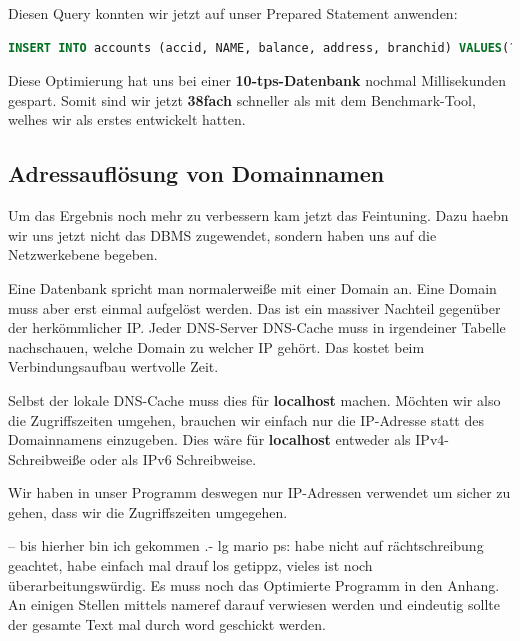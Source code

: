 Diesen Query konnten wir jetzt auf unser Prepared Statement anwenden:
\begin{lstlisting}[language=sql]
INSERT INTO accounts (accid, NAME, balance, address, branchid) VALUES(?, 'account', 0,'test', trunc(random() * n + 1))
\end{lstlisting}

Diese Optimierung  hat uns bei einer \textbf{10-tps-Datenbank} nochmal  Millisekunden gespart. Somit sind wir jetzt \textbf{38fach} schneller 
als mit dem Benchmark-Tool, welhes wir als erstes entwickelt hatten.



\subsection{Adressauflösung von Domainnamen}
Um das Ergebnis noch mehr zu verbessern kam jetzt das Feintuning. Dazu
haebn wir uns jetzt nicht das DBMS zugewendet, sondern haben uns auf die Netzwerkebene begeben.

Eine Datenbank spricht man normalerweiße mit einer Domain an. 
Eine Domain muss aber erst einmal aufgelöst werden.
Das ist ein massiver Nachteil gegenüber der herkömmlicher IP. Jeder
DNS-Server \bzw DNS-Cache muss in irgendeiner Tabelle nachschauen, welche Domain
zu welcher IP gehört. Das kostet beim Verbindungsaufbau wertvolle Zeit.

Selbst der lokale DNS-Cache muss dies \zB für \textbf{localhost} machen.
Möchten wir also die Zugriffszeiten umgehen, brauchen wir einfach nur die IP-Adresse
statt des Domainnamens einzugeben. Dies wäre für \textbf{localhost} entweder  als
IPv4-Schreibweiße oder \gqq{[::1]} als IPv6 Schreibweise.

Wir haben in unser Programm deswegen nur IP-Adressen verwendet um sicher zu gehen, dass wir 
die Zugriffszeiten umgegehen.

-- bis hierher bin ich gekommen .- lg mario
ps: habe nicht auf rächtschreibung geachtet, habe einfach mal drauf los getippz,
vieles ist noch überarbeitungswürdig. Es muss noch das Optimierte Programm in
den Anhang. An einigen Stellen mittels nameref darauf verwiesen werden und
eindeutig sollte der gesamte Text mal durch word geschickt werden.
\clearpage